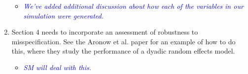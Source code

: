 \begin{enumerate}
	\begin{itemize}
		\item \textcolor{blue}{ \emph{
		We've added additional discussion about how each of the variables in our simulation were generated.
		}}
	\end{itemize}
	\item Section 4 needs to incorporate an assessment of robustness to misspecification.  See the Aronow et al. paper for an example of how to do this, where they study the performance of a dyadic random effects model.
	\begin{itemize}
		\item \textcolor{blue}{ \emph{
		SM will deal with this.
		}}
	\end{itemize}
\end{enumerate}
